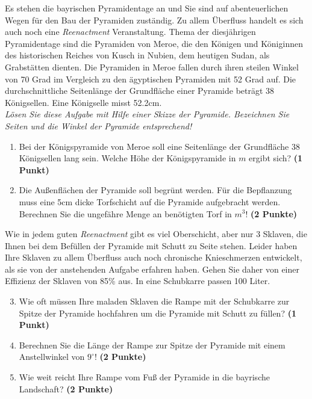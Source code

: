 \documentclass[a4paper, 9pt]{scrartcl}\usepackage[]{graphicx}\usepackage[]{xcolor}
\begin{document}
Es stehen die bayrischen Pyramidentage an und Sie sind auf
abenteuerlichen Wegen f{\"u}r den Bau der Pyramiden zust{\"a}ndig. Zu allem
{\"U}berfluss handelt es sich auch noch eine \textit{Reenactment}
Veranstaltung. Thema der diesj{\"a}hrigen Pyramidentage sind die Pyramiden von
Meroe, die den K{\"o}nigen und K{\"o}niginnen des historischen Reiches von Kusch in
Nubien, dem heutigen Sudan, als Grabst{\"a}tten dienten. Die Pyramiden in Meroe
fallen durch ihren steilen Winkel von 70 Grad im Vergleich zu
den {\"a}gyptischen Pyramiden mit 52 Grad auf. Die durchschnittliche
Seitenl{\"a}nge der Grundfl{\"a}che einer Pyramide betr{\"a}gt 38 K{\"o}nigsellen. Eine K{\"o}nigselle
misst 52.2cm.\\

\textit{L{\"o}sen Sie diese Aufgabe mit Hilfe einer Skizze der Pyramide. Bezeichnen
  Sie Seiten und die Winkel der Pyramide entsprechend!}

\begin{enumerate}
\item Bei der K{\"o}nigspyramide von Meroe soll eine Seitenl{\"a}nge der Grundfl{\"a}che
  38 K{\"o}nigsellen lang sein. Welche H{\"o}he der K{\"o}nigspyramide in $m$
  ergibt sich? \textbf{(1 Punkt)}
\item Die Au{\ss}enfl{\"a}chen der Pyramide soll begr{\"u}nt werden. F{\"u}r die
  Bepflanzung muss eine 5cm dicke Torfschicht auf die
  Pyramide aufgebracht werden. Berechnen Sie die ungef{\"a}hre Menge an
  ben{\"o}tigten Torf in $m^3$! \textbf{(2 Punkte)}
\end{enumerate}

Wie in jedem guten \textit{Reenactment} gibt es viel Oberschicht, aber nur
3 Sklaven, die Ihnen bei dem Bef{\"u}llen der Pyramide mit Schutt
zu Seite stehen. Leider haben Ihre Sklaven zu allem {\"U}berfluss auch noch
chronische Knieschmerzen entwickelt, als sie von der
anstehenden Aufgabe erfahren haben. Gehen Sie daher von einer Effizienz der
Sklaven von 85\% aus. In eine Schubkarre passen
100 Liter.

\begin{enumerate}
  \setcounter{enumi}{2}
\item Wie oft m{\"u}ssen Ihre maladen Sklaven die Rampe mit der Schubkarre
  zur Spitze der Pyramide hochfahren um die Pyramide mit Schutt zu f{\"u}llen? \textbf{(1 Punkt)}
\item Berechnen Sie die L{\"a}nge der Rampe zur Spitze der Pyramide mit einem
  Anstellwinkel von $9^\circ$! \textbf{(2 Punkte)}
\item Wie weit reicht Ihre Rampe vom Fu{\ss} der Pyramide in die bayrische
  Landschaft?  \textbf{(2 Punkte)}
\end{enumerate}
\end{document}
